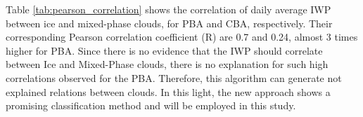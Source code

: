 Table \ref{tab:pearson_correlation} shows the correlation of daily average IWP between ice and mixed-phase clouds, for PBA and CBA, respectively. Their corresponding Pearson correlation coefficient (R) are 0.7 and 0.24, almost 3 times higher for PBA. Since there is no evidence that the IWP should correlate between Ice and Mixed-Phase clouds, there is no explanation for such high correlations observed for the PBA. Therefore, this algorithm can generate not explained relations between clouds. In this light, the new approach shows a promising classification method and will be employed in this study.


